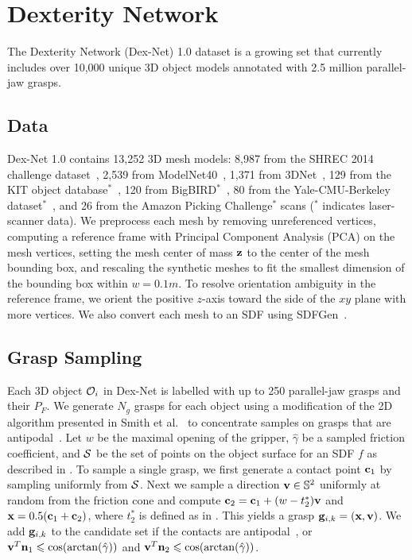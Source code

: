 \section{Dexterity Network}

The Dexterity Network (Dex-Net) 1.0 dataset is a growing set that currently includes over 10,000 unique 3D object models annotated with 2.5 million parallel-jaw grasps.

\subsection{Data}
Dex-Net 1.0 contains 13,252 3D mesh models: 8,987 from the SHREC 2014 challenge dataset~\cite{li2015comparison}, 2,539 from ModelNet40~\cite{wu20153d}, 1,371 from 3DNet~\cite{wohlkinger20123dnet}, 129 from the KIT object database$^*$~\cite{kasper2012kit}, 120 from BigBIRD$^*$~\cite{singh2014bigbird}, 80 from the Yale-CMU-Berkeley dataset$^*$~\cite{calli2015benchmarking}, and 26 from the Amazon Picking Challenge$^*$ scans ($^*$ indicates laser-scanner data).
We preprocess each mesh by removing unreferenced vertices, computing a reference frame with Principal Component Analysis (PCA) on the mesh vertices, setting the mesh center of mass $\mathbf{z}$ to the center of the mesh bounding box, and rescaling the synthetic meshes to fit the smallest dimension of the bounding box within $w = 0.1m$.
To resolve orientation ambiguity in the reference frame, we orient the positive $z$-axis toward the side of the $xy$ plane with more vertices. 
We also convert each mesh to an SDF using SDFGen~\cite{sdfgen}.

\subsection{Grasp Sampling}
Each 3D object $\mathcal{O}_i$ in Dex-Net is labelled with up to 250 parallel-jaw grasps and their $P_F$.
We generate $N_g$ grasps for each object using a modification of the 2D algorithm presented in Smith et al.~\cite{smith1999computing} to concentrate samples on grasps that are antipodal~\cite{mahler2015gp}.
Let $w$ be the maximal opening of the gripper, $\hat{\gamma}$ be a sampled friction coefficient, and $\mathcal{S}$ be the set of points on the object surface for an SDF $f$ as described in .
To sample a single grasp, we first generate a contact point $\mathbf{c}_1$ by sampling uniformly from $\mathcal{S}$.
Next we sample a direction $\mathbf{v} \in \mathbb{S}^2$ uniformly at random from the friction cone and compute $\mathbf{c}_2 = \mathbf{c}_1 + (w - t_2^*) \mathbf{v}$ and $\mathbf{x} = 0.5 (\mathbf{c}_1 + \mathbf{c}_2)$, where $t_2^*$ is defined as in .
This yields a grasp $\mathbf{g}_{i,k} = (\mathbf{x}, \mathbf{v})$.
We add $\mathbf{g}_{i,k}$ to the candidate set if the contacts are antipodal~\cite{mahler2015gp}, or $\mathbf{v}^T \mathbf{n}_1 \leqslant \cos(\arctan(\hat{\gamma}))$ and $\mathbf{v}^T \mathbf{n}_2 \leqslant \cos(\arctan(\hat{\gamma}))$.

